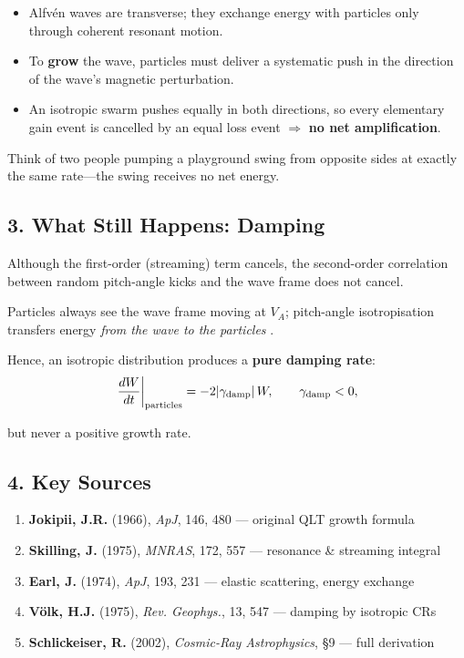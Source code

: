 \begin{itemize}
  \item Alfvén waves are transverse; they exchange energy with particles only through coherent resonant motion.
  \item To \textbf{grow} the wave, particles must deliver a systematic push in the direction of the wave’s magnetic perturbation.
  \item An isotropic swarm pushes equally in both directions, so every elementary gain event is cancelled by an equal loss event $\Rightarrow$ \textbf{no net amplification}.
\end{itemize}

Think of two people pumping a playground swing from opposite sides at exactly the same rate—the swing receives no net energy.

\subsection*{3. What Still Happens: Damping}

Although the first-order (streaming) term cancels, the second-order correlation between random pitch-angle kicks and the wave frame does not cancel.

Particles always see the wave frame moving at $V_A$; pitch-angle isotropisation transfers energy \textit{from the wave to the particles} \cite{Earl1974, Voelk1975}.

Hence, an isotropic distribution produces a \textbf{pure damping rate}:
\begin{equation}
\left.\frac{dW}{dt}\right|_{\text{particles}} = -2|\gamma_{\rm damp}|\,W, 
\qquad \gamma_{\rm damp} < 0,
\end{equation}

but never a positive growth rate.

\subsection*{4. Key Sources}

\begin{enumerate}
    \item \textbf{Jokipii, J.R.} (1966), \textit{ApJ}, 146, 480 — original QLT growth formula
    \item \textbf{Skilling, J.} (1975), \textit{MNRAS}, 172, 557 — resonance \& streaming integral
    \item \textbf{Earl, J.} (1974), \textit{ApJ}, 193, 231 — elastic scattering, energy exchange
    \item \textbf{Völk, H.J.} (1975), \textit{Rev. Geophys.}, 13, 547 — damping by isotropic CRs
    \item \textbf{Schlickeiser, R.} (2002), \textit{Cosmic-Ray Astrophysics}, §9 — full derivation
\end{enumerate}

